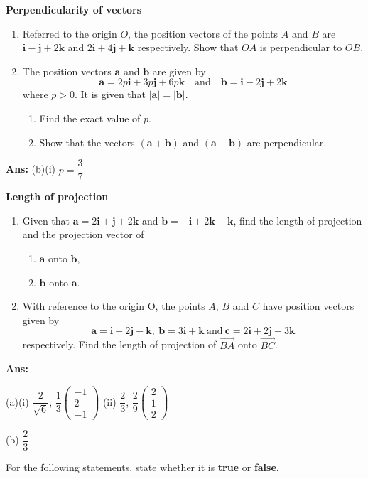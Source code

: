 \documentclass[a4paper,11pt,oneside]{book}
\providecommand{\vv}[1]{\overrightarrow{#1}}\providecommand{\cvv}[3]{\begin{pmatrix}#1\\#2\\#3\end{pmatrix}}
\newcounter{wq}[section]
\newcommand{\Q}[1]{\par\needspace{5\baselineskip}\medskip\stepcounter{wq}\noindent\textbf{\thewq}\quad #1\par}
\begin{document}
\Q{\textbf{Perpendicularity of vectors}\par\smallskip \begin{enumerate}[label=(\alph*)]
\item Referred to the origin $O$, the position vectors of the points $A$ and $B$ are $\mathbf i-\mathbf j+2\mathbf k$ and $2\mathbf i+4\mathbf j+\mathbf k$ respectively. Show that $OA$ is perpendicular to $OB$.
\item The position vectors $\mathbf a$ and $\mathbf b$ are given by
\[
\mathbf a=2p\mathbf i+3p\mathbf j+6p\mathbf k\quad\text{and}\quad\mathbf b=\mathbf i-2\mathbf j+2\mathbf k
\]
where $p>0$. It is given that $|\mathbf a|=|\mathbf b|$.
\begin{enumerate}[label=(\roman*)]
\item Find the exact value of $p$.
\item Show that the vectors $(\mathbf a+\mathbf b)$ and $(\mathbf a-\mathbf b)$ are perpendicular.
\end{enumerate}
\end{enumerate}}
\par\smallskip \textbf{Ans:} (b)(i) $p=\dfrac37$
\Q{\textbf{Length of projection}\par\smallskip \begin{enumerate}[label=(\alph*)]
\item Given that $\mathbf a=2\mathbf i+\mathbf j+2\mathbf k$ and $\mathbf b=-\mathbf i+2\mathbf k-\mathbf k$, find the length of projection and the projection vector of
\begin{enumerate}[label=(\roman*)]
\item $\mathbf a$ onto $\mathbf b$,
\item $\mathbf b$ onto $\mathbf a$.
\end{enumerate}
\item With reference to the origin O, the points $A$, $B$ and $C$ have position vectors given by
\[
\mathbf a=\mathbf i+2\mathbf j-\mathbf k,\ \mathbf b=3\mathbf i+\mathbf k\ \text{and}\ \mathbf c=2\mathbf i+2\mathbf j+3\mathbf k
\]
respectively. Find the length of projection of $\vv{BA}$ onto $\vv{BC}$.
\end{enumerate}}
\par\smallskip \textbf{Ans:}\par (a)(i) $\dfrac{2}{\sqrt6}$, $\dfrac13\cvv{-1}{2}{-1}$ \qquad (ii) $\dfrac23$, $\dfrac29\cvv{2}{1}{2}$\par (b) $\dfrac23$
\endgroup
\clearpage
\Q{For the following statements, state whether it is \textbf{true} or \textbf{false}.}
\end{document}
